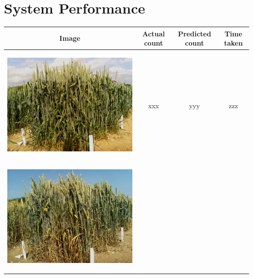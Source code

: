 \section{System Performance}
\begin{table}[hp!]
  \centering
  \begin{tabular}{ | c | c | c | c |}
    \hline
    Image & Actual count & Predicted count & Time taken \\ \hline
    \begin{minipage}{.3\textwidth}
      \begin{center}
		\includegraphics[width=\linewidth]{Images/001}
      \end{center}
    \end{minipage}
    &
      xxx
    & 
      yyy
    & 
      zzz
    \\ \hline
    \begin{minipage}{.3\textwidth}
      \begin{center}
		\includegraphics[width=\linewidth]{Images/002}

\end{center}
\end{minipage}
\end{tabular}
\end{table}
